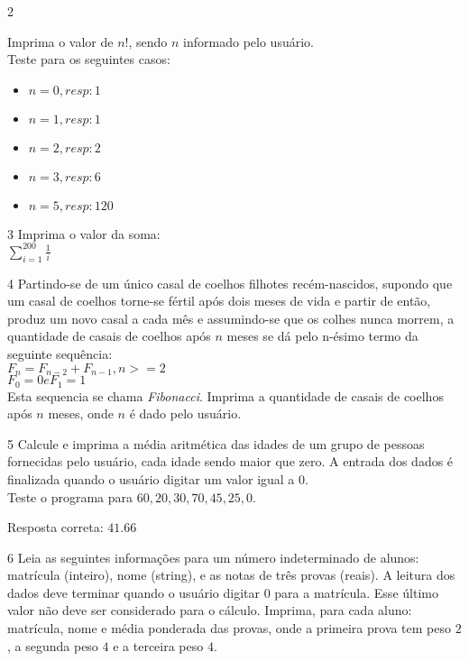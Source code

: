 \begin{exercicio}
  {2}
  {Imprima o valor de $n!$, sendo $n$ informado pelo usuário. \\
  Teste para os seguintes casos: \\
  \begin{itemize}
    \item $n = 0, resp: 1$
    \item $n = 1, resp: 1$
    \item $n = 2, resp: 2$
    \item $n = 3, resp: 6$
    \item $n = 5, resp: 120$
  \end{itemize}}
\end{exercicio}

\begin{exercicio}
  {3}
  {Imprima o valor da soma: \\
  $\sum\limits_{i=1}^{200} \frac{1}{i}$}
\end{exercicio}

\begin{exercicio}
  {4}
  {Partindo-se de um único casal de coelhos filhotes recém-nascidos, supondo que um casal de coelhos torne-se fértil após dois meses de vida e partir de então, produz um novo casal a cada mês e assumindo-se que os colhes nunca morrem, a quantidade de casais de coelhos após $n$ meses se dá pelo n-ésimo termo da seguinte sequência: \\
  $F_{n} = F_{n-2} + F_{n-1}, n>=2$ \\
  $F_{0} = 0  e F_{1} = 1$ \\
  Esta sequencia se chama \textit{Fibonacci}. Imprima a quantidade de casais de coelhos após $n$ meses, onde $n$ é dado pelo usuário.}
\end{exercicio}

\begin{exercicio}
  {5}
  {Calcule e imprima a média aritmética das idades de um grupo de pessoas fornecidas pelo usuário, cada idade sendo maior que zero. A entrada dos dados é finalizada quando o usuário digitar um valor igual a $0$. \\
  Teste o programa para $60,20,30,70,45,25,0$.}

  Resposta correta: $41.66$
\end{exercicio}

\begin{exercicio}
  {6}
  {Leia as seguintes informações para um número indeterminado de alunos: matrícula (inteiro), nome (string), e as notas de três provas (reais). A leitura dos dados deve terminar quando o usuário digitar $0$ para a matrícula. Esse último valor não deve ser considerado para o cálculo. Imprima, para cada aluno: matrícula, nome e média ponderada das provas, onde a primeira prova tem peso $2$, a segunda peso $4$ e a terceira peso $4$.}
\end{exercicio}